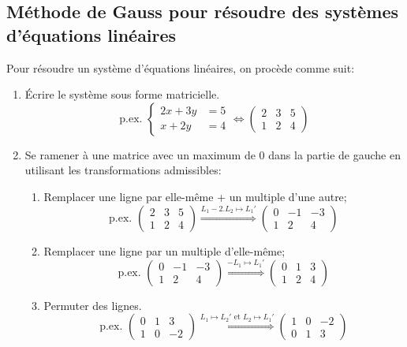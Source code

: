 \subsection{Méthode de Gauss pour résoudre des systèmes d'équations linéaires}

Pour résoudre un système d'équations linéaires, on procède comme suit:
\begin{enumerate}
	\item Écrire le système sous forme matricielle. \[\text{p.ex. } \begin{cases} 2x+3y &= 5 \\ x+2y &= 4 \end{cases} \Leftrightarrow \left(\begin{array}{cc|c} 2 & 3 & 5 \\ 1 & 2 & 4 \end{array}\right) \]
	\item Se ramener à une matrice avec un maximum de $0$ dans la partie de gauche en utilisant les transformations admissibles:
	      \begin{enumerate}
		      \item Remplacer une ligne par elle-même + un multiple d'une autre;
		            \[\text{p.ex. } \left(\begin{array}{cc|c} 2 & 3 & 5 \\ 1 & 2 & 4 \end{array}\right)  \stackrel{L_1  - 2. L_2 \mapsto L_1'}{\Longrightarrow} \left(\begin{array}{cc|c} 0 & -1 & -3 \\ 1 & 2 & 4 \end{array}\right) \]
		      \item Remplacer une ligne par un multiple d'elle-même;
		            \[\text{p.ex. } \left(\begin{array}{cc|c} 0 & -1 & -3 \\ 1 & 2 & 4 \end{array}\right)  \stackrel{-L_1  \mapsto L_1'}{\Longrightarrow} \left(\begin{array}{cc|c} 0 & 1 & 3 \\ 1 & 2 & 4 \end{array}\right) \]
		      \item Permuter des lignes.
		            \[\text{p.ex. } \left(\begin{array}{cc|c} 0 & 1 & 3 \\ 1 & 0 & -2 \end{array}\right)  \stackrel{L_1  \mapsto L_2' \text{ et } L_2  \mapsto L_1'}{\Longrightarrow} \left(\begin{array}{cc|c} 1 & 0 & -2 \\ 0 & 1 & 3  \end{array}\right) \]

\end{enumerate}
\end{enumerate}
